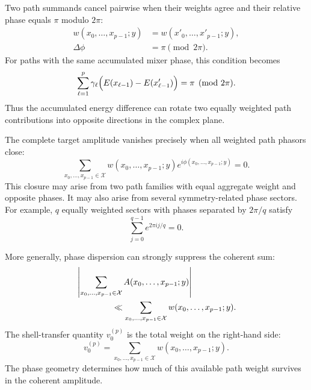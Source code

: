 \documentclass[a4paper,onecolumn,11pt,unpublished]{quantumarticle}
\theoremstyle{remark}
\begin{document}
Two path summands cancel pairwise when their weights agree and their
relative phase equals \(\pi\) modulo \(2\pi\):
\begin{align}
\label{eq:pairwise-path-cancellation-condition}
w(x_0,\ldots,x_{p-1};y)
&=
w(x'_0,\ldots,x'_{p-1};y),
\\
\Delta\phi
&=
\pi
\pmod{2\pi}.
\end{align}
For paths with the same accumulated mixer phase, this condition becomes
\begin{equation}
\label{eq:energy-induced-pairwise-cancellation}
\sum_{\ell=1}^{p}
\gamma_\ell
\Bigl(
E(x_{\ell-1})-E(x'_{\ell-1})
\Bigr)
=
\pi
\pmod{2\pi}.
\end{equation}
Thus the accumulated energy difference can rotate two equally weighted
path contributions into opposite directions in the complex plane.

The complete target amplitude vanishes precisely when all weighted
path phasors close:
\begin{equation}
\label{eq:full-path-phasor-closure}
\sum_{x_0,\ldots,x_{p-1}\in\mathcal X}
w(x_0,\ldots,x_{p-1};y)
e^{i\phi(x_0,\ldots,x_{p-1};y)}
=
0.
\end{equation}
This closure may arise from two path families with equal aggregate
weight and opposite phases. It may also arise from several
symmetry-related phase sectors. For example, \(q\) equally weighted
sectors with phases separated by \(2\pi/q\) satisfy
\begin{equation}
\label{eq:root-of-unity-path-cancellation}
\sum_{j=0}^{q-1}
e^{2\pi i j/q}
=
0.
\end{equation}

More generally, phase dispersion can strongly suppress the coherent
sum:
\begin{align}
\label{eq:strong-path-sum-suppression}
&
\left|
\sum_{x_0,\ldots,x_{p-1}\in\mathcal X}
A(x_0,\ldots,x_{p-1};y)
\right|
\notag\\
&\hspace{1.5cm}
\ll
\sum_{x_0,\ldots,x_{p-1}\in\mathcal X}
w(x_0,\ldots,x_{p-1};y).
\end{align}
The shell-transfer quantity \(v_0^{(p)}\) is the total weight on the
right-hand side:
\begin{equation}
\label{eq:v0-as-total-path-weight}
v_0^{(p)}
=
\sum_{x_0,\ldots,x_{p-1}\in\mathcal X}
w(x_0,\ldots,x_{p-1};y).
\end{equation}
The phase geometry determines how much of this available path weight
survives in the coherent amplitude.
\end{document}
